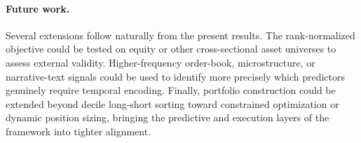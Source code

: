 \paragraph{Future work.}
Several extensions follow naturally from the present results.
The rank-normalized objective could be tested on equity or other
cross-sectional asset universes to assess external validity.
Higher-frequency order-book, microstructure, or narrative-text signals could
be used to identify more precisely which predictors genuinely require temporal
encoding.
Finally, portfolio construction could be extended beyond decile long-short
sorting toward constrained optimization or dynamic position sizing, bringing
the predictive and execution layers of the framework into tighter alignment.
